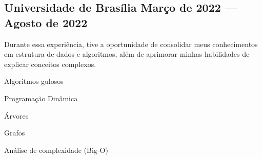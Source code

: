 \documentclass[a4paper,12pt]{article}
\begin{document}

\vspace{1.5em}
\vspace*{7pt}
\vspace{1.5em}

\subsection*{\large Universidade de Brasília  \hfill Março de 2022 --- Agosto de 2022}
\vspace*{3pt}

Durante essa experiência, tive a oportunidade de consolidar meus conhecimentos em estrutura de dados e algoritmos, além de aprimorar minhas habilidades de explicar conceitos complexos.

\begin{zitemize}
    \item Algoritmos gulosos
    \item Programação Dinâmica
    \item Árvores
    \item Grafos 
    \item Análise de complexidade (Big-O)
\end{zitemize}




\end{document}
